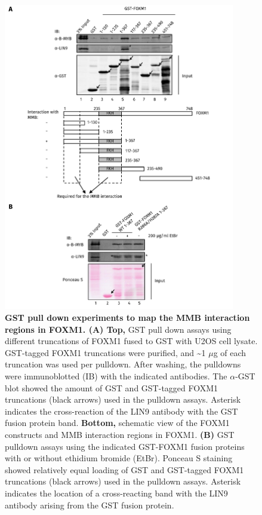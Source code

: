 \begin{figure}[!t]
    \centering
    \includegraphics[width=0.9\textwidth]{chapter3/figures_foxm1/fig31.pdf}
    \caption[GST pull down experiments to map the MMB interaction regions in FOXM1]{\textbf{GST pull down experiments to map the MMB interaction regions in FOXM1. (A) Top,} GST pull down assays using different truncations of FOXM1 fused to GST with U2OS cell lysate. GST-tagged FOXM1 truncations were purified, and \textasciitilde 1 $\mu$g of each truncation was used per pulldown. After washing, the pulldowns were immunoblotted (IB) with the indicated antibodies. The $\alpha$-GST blot showed the amount of GST and GST-tagged FOXM1 truncations (black arrows) used in the pulldown assays. Asterisk indicates the cross-reaction of the LIN9 antibody with the GST fusion protein band. \textbf{Bottom,} schematic view of the FOXM1 constructs and MMB interaction regions in FOXM1. \textbf{(B)} GST pulldown assays using the indicated GST-FOXM1 fusion proteins with or without ethidium bromide (EtBr). Ponceau S staining showed relatively equal loading of GST and GST-tagged FOXM1 truncations (black arrows) used in the pulldown assays. Asterisk indicates the location of a cross-reacting band with the LIN9 antibody arising from the GST fusion protein.}
    \label{fig:fig31}
\end{figure}

